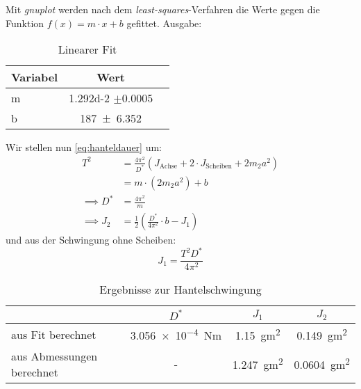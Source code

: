 Mit \emph{gnuplot} werden nach dem \emph{least-squares}-Verfahren die Werte gegen die Funktion $f(x)=m\cdot x+b$ gefittet. Ausgabe:

\begin{table}[H]
  \centering
  \begin{tabular}{l | c | c}
    Variabel & Wert \\ \hline
    m & \num{1.292d-2} $\pm 0.0005$ \\
    b & \num{187\pm 6.352} 
  \end{tabular}
  \caption{Linearer Fit}
  \label{tab:durchbiegungsfit}
\end{table}

Wir stellen nun \cref{eq:hanteldauer} um:
\begin{align}
  T^2&=\frac{4\pi^2}{D^*}(J_{\text{Achse}}+2\cdot J_{\text{Scheiben}}+2m_2a^2) \\
  &=m\cdot (2m_2 a^2)+b \\
  \implies D^*&=\frac{4\pi^2}{m} \\
  \implies J_2 &=\frac{1}{2}\left(\frac{D^*}{4 \pi^2}\cdot b - J_1\right)
  \label{eq:hantelergebnis}
\end{align}
und aus der Schwingung ohne Scheiben:
\begin{equation}
  J_1 = \frac{T^2 D^*}{4 \pi^2}
  \label{eq:hantelohnescheibe}
\end{equation}
\begin{table}[H]
  \centering
  \begin{tabular}{l | c | c | c}
    &$D^*$ & $J_1$ & $J_2$ \\ \hline
    aus Fit berechnet & \SI{3.056e-4}{Nm} & \SI{1.15}{gm^2} & \SI{0.149}{gm^2} \\
    aus Abmessungen berechnet & - & \SI{1.247}{gm^2} & \SI{0.0604}{gm^2}
  \end{tabular}
  \caption{Ergebnisse zur Hantelschwingung}
  \label{tab:hantelergebnisse}
\end{table}
